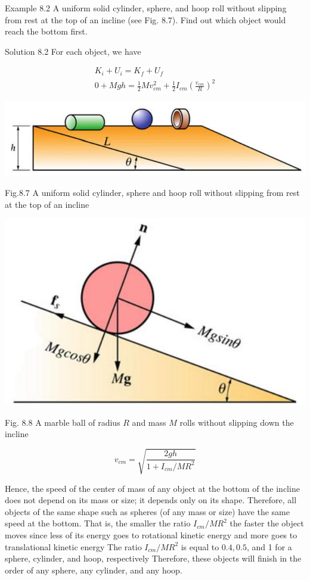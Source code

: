 \documentclass[10pt]{article}
\begin{document}
Example 8.2 A uniform solid cylinder, sphere, and hoop roll without slipping from rest at the top of an incline (see Fig. 8.7). Find out which object would reach the bottom first.

Solution 8.2 For each object, we have

$$
\begin{gathered}
K_{i}+U_{i}=K_{f}+U_{f} \\
0+M g h=\frac{1}{2} M v_{c m}^{2}+\frac{1}{2} I_{c m}\left(\frac{v_{c m}}{R}\right)^{2}
\end{gathered}
$$

\begin{center}
\includegraphics[max width=\textwidth]{2024_09_13_db1f357d2aad0a03eb2eg-133(2)}
\end{center}

Fig.8.7 A uniform solid cylinder, sphere and hoop roll without slipping from rest at the top of an incline

\begin{center}
\includegraphics[max width=\textwidth]{2024_09_13_db1f357d2aad0a03eb2eg-133}
\end{center}

Fig. 8.8 A marble ball of radius $R$ and mass $M$ rolls without slipping down the incline

$$
v_{c m}=\sqrt{\frac{2 g h}{1+I_{c m} / M R^{2}}}
$$

Hence, the speed of the center of mass of any object at the bottom of the incline does not depend on its mass or size; it depends only on its shape. Therefore, all objects of the same shape such as spheres (of any mass or size) have the same speed at the bottom. That is, the smaller the ratio $I_{c m} / M R^{2}$ the faster the object moves since less of its energy goes to rotational kinetic energy and more goes to translational kinetic energy The ratio $I_{c m} / M R^{2}$ is equal to $0.4,0.5$, and 1 for a sphere, cylinder, and hoop, respectively Therefore, these objects will finish in the order of any sphere, any cylinder, and any hoop.
\end{document}
